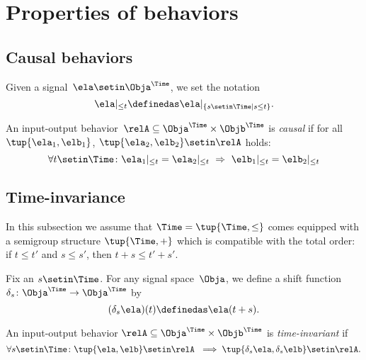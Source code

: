 
\section{Properties of behaviors}

\subsection{Causal behaviors}

Given a signal~$\ela \setin \Obja^\Time$, we set the notation
\begin{equation}
    \ela \vert_{\leq t} \definedas  \ela \vert_{\{ s \setin \Time \mid s \leq t\}}.
\end{equation}

\begin{definition}
    An input-output behavior~$\relA \subseteq \Obja^\Time \times \Objb^\Time$ is \emph{causal} if for all~$\tup{\ela_1, \elb_1}$, $\tup{\ela_2, \elb_2} \setin \relA$ holds:
    \begin{equation*}
        \forall t \setin \Time\colon \ela_1 \vert_{ \leq t} = \ela_2 \vert_{ \leq t} \  \Rightarrow \ \elb_1 \vert_{ \leq t} = \elb_2 \vert_{ \leq t}
    \end{equation*}
\end{definition}


\subsection{Time-invariance}

In this subsection we assume that $\Time = \tup{\Time, \leq}$ comes equipped with a semigroup structure $\tup{\Time, +}$ which is compatible with the total order: if $t \leq t'$ and $s \leq s'$, then $t + s \leq t' + s'$.

Fix an $s \setin \Time$.
For any signal space~$\Obja$, we define a shift function~$\delta_s\colon \Obja^\Time \to \Obja^\Time$ by
\begin{equation*}
    (\delta_s \ela)(t) \definedas \ela(t + s).
\end{equation*}

\begin{definition}
    An input-output behavior $\relA \subseteq \Obja^\Time \times \Objb^\Time$ is \emph{time-invariant} if
    \begin{equation*}
        \forall s \setin \Time\colon \tup{\ela, \elb} \setin \relA  \ \implies \tup{\delta_s \ela, \delta_s \elb} \setin \relA.
    \end{equation*}
\end{definition}


